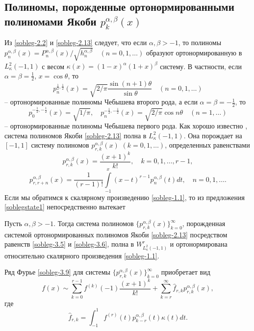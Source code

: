\subsection{Полиномы, порожденные  ортонормированными полиномами Якоби $p_{k}^{\alpha,\beta}(x)$}\label{sobleg4}


Из \eqref{sobleg-2.2} и \eqref{sobleg-2.13} следует, что если $\alpha,\beta>-1$, то полиномы $p_n^{\alpha,\beta}(x)=P_n^{\alpha,\beta}(x)/\sqrt{ h_n^{\alpha,\beta}}\quad(n=0,1,\ldots)$
образуют ортонормированную  в $L_\kappa^2(-1,1)$ с весом $\kappa(x)=(1-x)^\alpha(1+x)^\beta$ систему. В частности, если $\alpha=\beta=\frac12$, $x=\cos\theta$, то
$$
 p_n^{\frac12,\frac12}(x)=\sqrt{2/\pi}\frac{\sin(n+1)\theta}{\sin\theta}\quad (n=0,1,\ldots)
 $$
 -- ортонормированные полиномы Чебышева второго рода, а если $\alpha=\beta=-\frac12$, то
\begin{equation}\label{sobleg-3.25}
p_0^{-\frac12,-\frac12}(x)=\sqrt{1/\pi},\quad  p_n^{-\frac12,-\frac12}(x)=\sqrt{2/\pi}\cos n\theta\quad (n=1,\ldots)
\end{equation}
 -- ортонормированные полиномы Чебышева первого рода.
 Как хорошо известно \cite{Sege}, система полиномов Якоби \eqref{sobleg-2.13} полна в $L_\kappa^2(-1,1)$.   Она порождает на $[-1,1]$ систему полиномов  $p_{r,k}^{\alpha,\beta}(x)$ $(k=0,1,\ldots)$, определенных равенствами
   \begin{equation}\label{sobleg-3.26}
p_{r,k}^{\alpha,\beta}(x) =\frac{(x+1)^k}{k!}, \quad k=0,1,\ldots, r-1,
\end{equation}
  \begin{equation}\label{sobleg-3.27}
p_{r,r+n}^{\alpha,\beta}(x) =\frac{1}{(r-1)!}\int\limits_{-1}^x(x-t)^{r-1}p_n^{\alpha,\beta}(t)dt, \quad n=0,1,\ldots.
\end{equation}
Если мы обратимся к скалярному произведению \eqref{sobleg-1.1}, то из предложения \ref{soblegstate1} непосредственно вытекает
\begin{corollary}
Пусть $\alpha,\beta>-1$. Тогда система полиномов $\{p_{r,k}^{\alpha,\beta}(x)\}_{k=0}^\infty$, порожденная системой ортонормированных полиномов Якоби \eqref{sobleg-2.13} посредством равенств \eqref{sobleg-3.5} и \eqref{sobleg-3.6}, полна  в $W^r_{L^2_\kappa(-1,1)}$ и ортонормирована относительно скалярного произведения \eqref{sobleg-1.1}.
\end{corollary}
Ряд Фурье \eqref{sobleg-3.9} для системы   $\{p_{r,k}^{\alpha,\beta}(x)\}_{k=0}^\infty$ приобретает вид
\begin{equation}\label{sobleg-3.28}
f(x)\sim \sum_{k=0}^{r-1} f^{(k)}(-1)\frac{(x+1)^k}{k!}+ \sum_{k=r}^\infty \hat f_{r,k}p_{r,k}^{\alpha,\beta}(x),
\end{equation}
где
  \begin{equation}\label{sobleg-3.29}
 \hat f_{r,k}=\int_{-1}^1 f^{(r)}(t)p_{k-r}^{\alpha,\beta}(t)\kappa(t)dt.
\end{equation}

